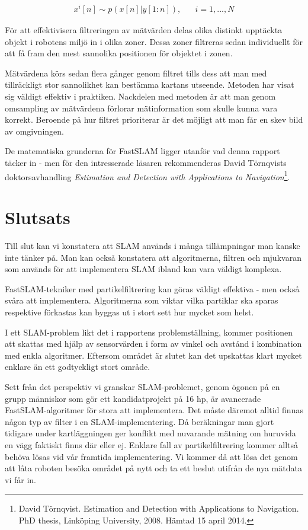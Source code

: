 \documentclass[a4paper,12pt,fleqn]{article}
\begin{document}
\begin{gather}
x^i[n] \sim p(x[n]|y[1:n]),\;\;\;\;\;\; i = 1, ..., N
\end{gather}

För att effektivisera filtreringen av mätvärden delas olika distinkt upptäckta objekt i robotens miljö in i olika zoner. Dessa zoner filtreras sedan individuellt för att få fram den mest sannolika positionen för objektet i zonen. 

Mätvärdena körs sedan flera gånger genom filtret tills dess att man med tillräckligt stor sannolikhet kan bestämma kartans utseende. Metoden har visat sig väldigt effektiv i praktiken. Nackdelen med metoden är att man genom omsampling av mätvärdena förlorar mätinformation som skulle kunna vara korrekt. Beroende på hur filtret prioriterar är det möjligt att man får en skev bild av omgivningen.

De matematiska grunderna för FastSLAM ligger utanför vad denna rapport täcker in - men för den intresserade läsaren rekommenderas David Törnqvists doktorsavhandling \textit{Estimation and Detection with Applications to Navigation}\footnote{David Törnqvist. Estimation and Detection with Applications to Navigation. PhD thesis, Linköping University, 2008. Hämtad 15 april 2014.}.

\newpage
\section{Slutsats}

Till slut kan vi konstatera att SLAM används i många tillämpningar man kanske inte tänker på. Man kan också konstatera att algoritmerna, filtren och mjukvaran som används för att implementera SLAM ibland kan vara väldigt komplexa. 

FastSLAM-tekniker med partikelfiltrering kan göras väldigt effektiva - men också svåra att implementera. Algoritmerna som viktar vilka partiklar ska sparas respektive förkastas kan byggas ut i stort sett hur mycket som helst. 

I ett SLAM-problem likt det i rapportens problemställning, kommer positionen att skattas med hjälp av sensorvärden i form av vinkel och avstånd i kombination med enkla algoritmer. Eftersom området är slutet kan det upskattas klart mycket enklare än ett godtyckligt stort område. 

Sett från det perspektiv vi granskar SLAM-problemet, genom ögonen på en grupp människor som gör ett kandidatprojekt på 16 hp, är avancerade FastSLAM-algoritmer för stora att implementera. Det måste däremot alltid finnas någon typ av filter i en SLAM-implementering. Då beräkningar man gjort tidigare under kartläggningen ger konflikt med nuvarande mätning om huruvida en vägg faktiskt finns där eller ej. Enklare fall av partikelfiltrering kommer alltså behöva lösas vid vår framtida implementering. Vi kommer då att lösa det genom att låta roboten besöka området på nytt och ta ett beslut utifrån de nya mätdata vi får in. 
\end{document}
